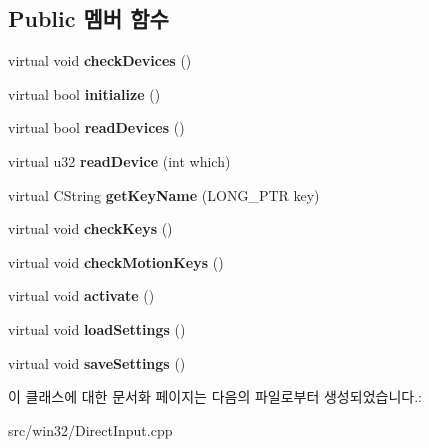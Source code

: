 \subsection*{Public 멤버 함수}
\begin{DoxyCompactItemize}
\item 
\mbox{\label{class_direct_input_a59a88d57b359bd26c800579edeb19419}} 
virtual void {\bfseries check\+Devices} ()
\item 
\mbox{\label{class_direct_input_a56c3e7924e9d115a2b20b31ee415d544}} 
virtual bool {\bfseries initialize} ()
\item 
\mbox{\label{class_direct_input_a53a2984e75989b381fdae4c8c33f5c32}} 
virtual bool {\bfseries read\+Devices} ()
\item 
\mbox{\label{class_direct_input_af7d74c03d302905eaa06e88ab37b7dac}} 
virtual u32 {\bfseries read\+Device} (int which)
\item 
\mbox{\label{class_direct_input_a8ea2797da0b1e806227628804591f63d}} 
virtual C\+String {\bfseries get\+Key\+Name} (L\+O\+N\+G\+\_\+\+P\+TR key)
\item 
\mbox{\label{class_direct_input_acecffb99132b93e827373a3683ce342b}} 
virtual void {\bfseries check\+Keys} ()
\item 
\mbox{\label{class_direct_input_a6e54dc09ff20e12dfe98a24607172c34}} 
virtual void {\bfseries check\+Motion\+Keys} ()
\item 
\mbox{\label{class_direct_input_a4d81c1ee99e76949dac0acac4bad0937}} 
virtual void {\bfseries activate} ()
\item 
\mbox{\label{class_direct_input_a4b63243a3581158956baf495a0dee51e}} 
virtual void {\bfseries load\+Settings} ()
\item 
\mbox{\label{class_direct_input_aaf3473a97962c8dad1ef6715b5164c9d}} 
virtual void {\bfseries save\+Settings} ()
\end{DoxyCompactItemize}


이 클래스에 대한 문서화 페이지는 다음의 파일로부터 생성되었습니다.\+:\begin{DoxyCompactItemize}
\item 
src/win32/Direct\+Input.\+cpp\end{DoxyCompactItemize}
